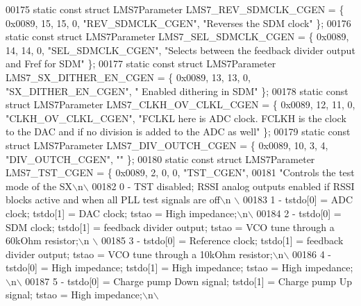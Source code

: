 \begin{DoxyCode}
00175 \textcolor{keyword}{static} \textcolor{keyword}{const} \textcolor{keyword}{struct }LMS7Parameter LMS7_REV_SDMCLK_CGEN = \{ 0x0089, 15, 15, 0, \textcolor{stringliteral}{"REV\_SDMCLK\_CGEN"}, \textcolor{stringliteral}{"Reverses
       the SDM clock"} \};
00176 \textcolor{keyword}{static} \textcolor{keyword}{const} \textcolor{keyword}{struct }LMS7Parameter LMS7_SEL_SDMCLK_CGEN = \{ 0x0089, 14, 14, 0, \textcolor{stringliteral}{"SEL\_SDMCLK\_CGEN"}, \textcolor{stringliteral}{"Selects
       between the feedback divider output and Fref for SDM"} \};
00177 \textcolor{keyword}{static} \textcolor{keyword}{const} \textcolor{keyword}{struct }LMS7Parameter LMS7_SX_DITHER_EN_CGEN = \{ 0x0089, 13, 13, 0, \textcolor{stringliteral}{"SX\_DITHER\_EN\_CGEN"}, \textcolor{stringliteral}{"
      Enabled dithering in SDM"} \};
00178 \textcolor{keyword}{static} \textcolor{keyword}{const} \textcolor{keyword}{struct }LMS7Parameter LMS7_CLKH_OV_CLKL_CGEN = \{ 0x0089, 12, 11, 0, \textcolor{stringliteral}{"CLKH\_OV\_CLKL\_CGEN"}, \textcolor{stringliteral}{"FCLKL
       here is ADC clock. FCLKH is the clock to the DAC and if no division is added to the ADC as well"} \};
00179 \textcolor{keyword}{static} \textcolor{keyword}{const} \textcolor{keyword}{struct }LMS7Parameter LMS7_DIV_OUTCH_CGEN = \{ 0x0089, 10, 3, 4, \textcolor{stringliteral}{"DIV\_OUTCH\_CGEN"}, \textcolor{stringliteral}{""} \};
00180 \textcolor{keyword}{static} \textcolor{keyword}{const} \textcolor{keyword}{struct }LMS7Parameter LMS7_TST_CGEN = \{ 0x0089, 2, 0, 0, \textcolor{stringliteral}{"TST\_CGEN"},
00181 \textcolor{stringliteral}{"Controls the test mode of the SX\(\backslash\)n\(\backslash\)}
00182 \textcolor{stringliteral}{0 - TST disabled; RSSI analog outputs enabled if RSSI blocks active and when all PLL test signals are off\(\backslash\)n
      \(\backslash\)}
00183 \textcolor{stringliteral}{1 - tstdo[0] = ADC clock; tstdo[1] = DAC clock; tstao = High impedance;\(\backslash\)n\(\backslash\)}
00184 \textcolor{stringliteral}{2 - tstdo[0] = SDM clock; tstdo[1] = feedback divider output; tstao = VCO tune through a 60kOhm resistor;\(\backslash\)n
      \(\backslash\)}
00185 \textcolor{stringliteral}{3 - tstdo[0] = Reference clock; tstdo[1] = feedback divider output; tstao = VCO tune through a 10kOhm
       resistor;\(\backslash\)n\(\backslash\)}
00186 \textcolor{stringliteral}{4 - tstdo[0] = High impedance; tstdo[1] = High impedance; tstao = High impedance;\(\backslash\)n\(\backslash\)}
00187 \textcolor{stringliteral}{5 - tstdo[0] = Charge pump Down signal; tstdo[1] = Charge pump Up signal; tstao = High impedance;\(\backslash\)n\(\backslash\)}

\end{DoxyCode}
